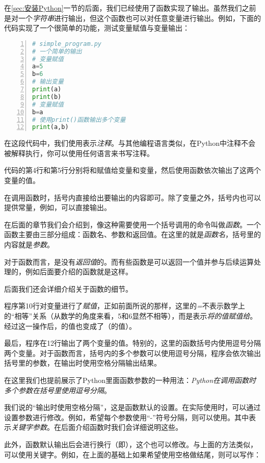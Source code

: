 在\ref{sec:安装Python}一节的后面，我们已经使用了函数实现了输出。虽然我们之前是对一个\emph{字符串}进行输出，但这个函数也可以对任意变量进行输出。例如，下面的代码实现了一个很简单的功能，测试变量赋值与变量输出：

\begin{lstlisting}[language=python,caption={simple\_program.py},numbers=left]
# simple_program.py
# 一个简单的输出
# 变量赋值
a=5
b=6
# 输出变量
print(a)
print(b)
# 变量赋值
b=a
# 使用print()函数输出多个变量
print(a,b)
\end{lstlisting}

在这段代码中，我们使用\code{\#}表示\emph{注释}。与其他编程语言类似，在Python中注释不会被解释执行，你可以使用任何语言来书写注释。

代码的第4行和第5行分别将和赋值给变量和变量，然后使用函数依次输出了这两个变量的值。

在调用函数时，括号内直接给出要输出的内容即可。除了变量之外，括号内也可以提供常量，例如，可以直接输出。

\begin{attention}
    在后面的章节我们会介绍到，像这种需要使用一个括号调用的命令叫做\emph{函数}。一个函数主要由三部分组成：函数名、参数和返回值。在这里的就是\emph{函数名}，括号里的内容就是\emph{参数}。

    对于函数而言，是没有\emph{返回值}的。而有些函数是可以返回一个值并参与后续运算处理的，例如后面要介绍的函数就是这样。

    后面我们还会详细介绍关于函数的细节。
\end{attention}

程序第10行对变量进行了\emph{赋值}，正如前面所说的那样，这里的\emph{=}不表示数学上的“相等”关系（从数学的角度来看，5和6显然不相等），而是表示\emph{将的值赋值给}。经过这一操作后，的值也变成了（的值）。

最后，程序在12行输出了两个变量的值。特别的，这里的函数括号内使用逗号分隔两个变量。对于函数而言，括号内的多个参数可以使用逗号分隔，程序会依次输出括号里的参数，在输出时使用空格分隔输出结果。

\begin{attention}
    在这里我们也提前展示了Python里面函数参数的一种用法：\emph{Python在调用函数时多个参数在括号里使用逗号分隔}。
\end{attention}

\begin{extend}
    我们说的“输出时使用空格分隔”，这是函数默认的设置。在实际使用时，可以通过设置参数进行修改。例如，希望每个参数使用“-”符号分隔，则可以使用。其中表示\emph{关键字参数}。在后面介绍函数时我们会详细说明这些。

    此外，函数默认输出后会进行换行（即），这个也可以修改。与上面的方法类似，可以使用关键字。例如，在上面的基础上如果希望使用空格做结尾，则可以写作：
\end{extend}

